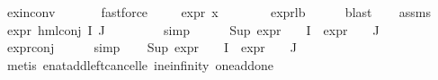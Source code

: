\begin{isabellebody}
\ ex{\isacharunderscore}{\kern0pt}in{\isacharunderscore}{\kern0pt}conv\ \isanewline
\ \ \ \ \isamarkupfalse%
\ fastforce\ \isanewline
\ \ \isamarkupfalse%
\ {\isachardoublequoteopen}expr{\isacharunderscore}{\kern0pt}{}\ x\ {\isasymge}\ {}{\isachardoublequoteclose}\isanewline
\ \ \ \ \isamarkupfalse%
\ expr{\isacharunderscore}{\kern0pt}{}{\isacharunderscore}{\kern0pt}lb\isanewline
\ \ \ \ \isamarkupfalse%
\ blast\isanewline
\ \ \isamarkupfalse%
\ assms\ \isamarkupfalse%
\ {\isachardoublequoteopen}expr{\isacharunderscore}{\kern0pt}{}\ {\isacharparenleft}{\kern0pt}hml{\isacharunderscore}{\kern0pt}conj\ I\ J\ {\isasymPhi}{\isacharparenright}{\kern0pt}\ {\isasymle}\ {}{\isachardoublequoteclose}\isanewline
\ \ \ \ \isamarkupfalse%
\ simp\isanewline
\ \ \isamarkupfalse%
\ {\isachardoublequoteopen}{}\ {\isacharplus}{\kern0pt}\ Sup\ {\isacharparenleft}{\kern0pt}{\isacharparenleft}{\kern0pt}expr{\isacharunderscore}{\kern0pt}{}\ {\isasymcirc}\ {\isasymPhi}{\isacharparenright}{\kern0pt}\ {\isacharbackquote}{\kern0pt}\ I\ {\isasymunion}\ {\isacharparenleft}{\kern0pt}expr{\isacharunderscore}{\kern0pt}{}\ {\isasymcirc}\ {\isasymPhi}{\isacharparenright}{\kern0pt}\ {\isacharbackquote}{\kern0pt}\ J{\isacharparenright}{\kern0pt}\ {\isasymle}\ {}{\isachardoublequoteclose}\isanewline
\ \ \ \ \isamarkupfalse%
\ expr{\isacharunderscore}{\kern0pt}{}{\isacharunderscore}{\kern0pt}conj\isanewline
\ \ \ \ \isamarkupfalse%
\ simp\isanewline
\ \ \isamarkupfalse%
\ {\isachardoublequoteopen}Sup\ {\isacharparenleft}{\kern0pt}{\isacharparenleft}{\kern0pt}expr{\isacharunderscore}{\kern0pt}{}\ {\isasymcirc}\ {\isasymPhi}{\isacharparenright}{\kern0pt}\ {\isacharbackquote}{\kern0pt}\ I\ {\isasymunion}\ {\isacharparenleft}{\kern0pt}expr{\isacharunderscore}{\kern0pt}{}\ {\isasymcirc}\ {\isasymPhi}{\isacharparenright}{\kern0pt}\ {\isacharbackquote}{\kern0pt}\ J{\isacharparenright}{\kern0pt}\ {\isasymle}\ {}{\isachardoublequoteclose}\isanewline
\ \ \ \ \isamarkupfalse%
\ {\isacharparenleft}{\kern0pt}metis\ enat{\isacharunderscore}{\kern0pt}add{\isacharunderscore}{\kern0pt}left{\isacharunderscore}{\kern0pt}cancel{\isacharunderscore}{\kern0pt}le\ i{}{\isacharunderscore}{\kern0pt}ne{\isacharunderscore}{\kern0pt}infinity\ one{\isacharunderscore}{\kern0pt}add{\isacharunderscore}{\kern0pt}one{\isacharparenright}{\kern0pt}\isanewline

\end{isabellebody}
